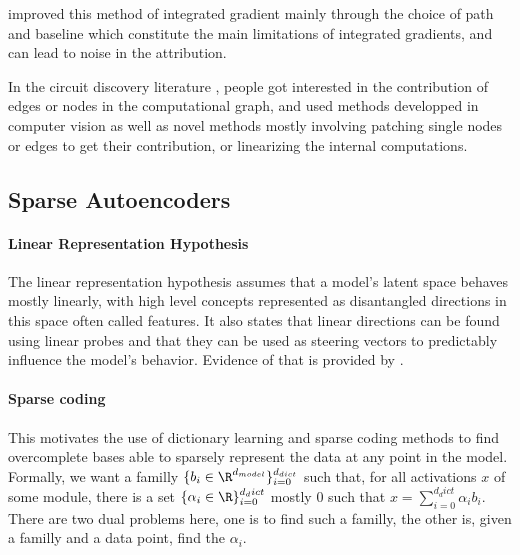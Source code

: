 \documentclass{article}
\begin{document}
\citet{smilkov2017smoothgradIG, miglani2020investigatingIG, kapishnikov2021guidedGIG} improved this method of integrated gradient mainly through the choice of path and baseline which constitute the main limitations of integrated gradients, and can lead to noise in the attribution. %

In the circuit discovery literature \citep{olah2020zoomCircuits}, people got interested in the contribution of edges or nodes in the computational graph, and used methods developped in computer vision \citep{syed2023attributionCircuits, marks2024sparseCircuits} as well as novel methods \citep{wang2022interpretabilityCircuits, conmy2023automatedACDCCircuits, ferrando2024informationCircuits, he2024dictionaryCircuits} mostly involving patching single nodes or edges to get their contribution, or linearizing the internal computations.

\subsection{Sparse Autoencoders}
\label{sec:SAE}

\paragraph{Linear Representation Hypothesis} The linear representation hypothesis assumes that a model's latent space behaves mostly linearly, with high level concepts represented as disantangled directions in this space often called features. It also states that linear directions can be found using linear probes and that they can be used as steering vectors to predictably influence the model's behavior. Evidence of that is provided by \citet{park2023linear, NIPS2013_9aa42b31, pennington2014glove, nanda2023emergent, gurnee2024language, wang2024concept, turner2024activationSteering}.

\paragraph{Sparse coding} This motivates the use of dictionary learning and sparse coding methods to find overcomplete bases able to sparsely represent the data at any point in the model. Formally, we want a familly $\{b_i \in \R^{d_{model}}\}_{i=0}^{d_{dict}}$ such that, for all activations $x$ of some module, there is a set $\{\alpha_i \in \R\}_{i=0}^{d_dict}$ mostly 0 such that $x = \sum_{i=0}^{d_dict} \alpha_i b_i$. There are two dual problems here, one is to find such a familly, the other is, given a familly and a data point, find the $\alpha_i$.
\end{document}
